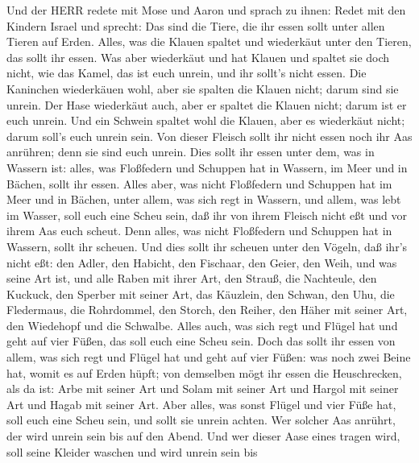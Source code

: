  Und der HERR redete mit Mose und Aaron und sprach zu ihnen:
 Redet mit den Kindern Israel und sprecht: Das sind die
Tiere, die ihr essen sollt unter allen Tieren auf Erden. 
Alles, was die Klauen spaltet und wiederkäut unter den Tieren, das sollt
ihr essen.  Was aber wiederkäut und hat Klauen und spaltet
sie doch nicht, wie das Kamel, das ist euch unrein, und ihr sollt's
nicht essen.  Die Kaninchen wiederkäuen wohl, aber sie
spalten die Klauen nicht; darum sind sie unrein.  Der Hase
wiederkäut auch, aber er spaltet die Klauen nicht; darum ist er euch
unrein.  Und ein Schwein spaltet wohl die Klauen, aber es
wiederkäut nicht; darum soll's euch unrein sein.  Von dieser
Fleisch sollt ihr nicht essen noch ihr Aas anrühren; denn sie sind euch
unrein.  Dies sollt ihr essen unter dem, was in Wassern ist:
alles, was Floßfedern und Schuppen hat in Wassern, im Meer und in
Bächen, sollt ihr essen.  Alles aber, was nicht Floßfedern
und Schuppen hat im Meer und in Bächen, unter allem, was sich regt in
Wassern, und allem, was lebt im Wasser, soll euch eine Scheu sein,
 daß ihr von ihrem Fleisch nicht eßt und vor ihrem Aas euch
scheut.  Denn alles, was nicht Floßfedern und Schuppen hat
in Wassern, sollt ihr scheuen.  Und dies sollt ihr scheuen
unter den Vögeln, daß ihr's nicht eßt: den Adler, den Habicht, den
Fischaar,  den Geier, den Weih, und was seine Art ist,
 und alle Raben mit ihrer Art,  den Strauß,
die Nachteule, den Kuckuck, den Sperber mit seiner Art, 
das Käuzlein, den Schwan, den Uhu,  die Fledermaus, die
Rohrdommel,  den Storch, den Reiher, den Häher mit seiner
Art, den Wiedehopf und die Schwalbe.  Alles auch, was sich
regt und Flügel hat und geht auf vier Füßen, das soll euch eine Scheu
sein.  Doch das sollt ihr essen von allem, was sich regt
und Flügel hat und geht auf vier Füßen: was noch zwei Beine hat, womit
es auf Erden hüpft;  von demselben mögt ihr essen die
Heuschrecken, als da ist: Arbe mit seiner Art und Solam mit seiner Art
und Hargol mit seiner Art und Hagab mit seiner Art.  Aber
alles, was sonst Flügel und vier Füße hat, soll euch eine Scheu sein,
 und sollt sie unrein achten. Wer solcher Aas anrührt, der
wird unrein sein bis auf den Abend.  Und wer dieser Aase
eines tragen wird, soll seine Kleider waschen und wird unrein sein bis
